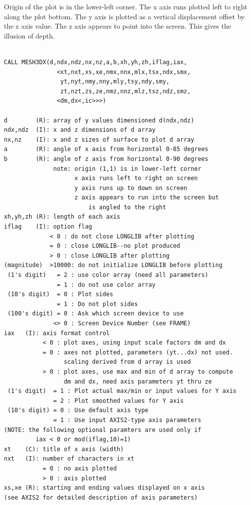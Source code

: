 \documentclass[11pt]{report}
\begin{document}
Origin of the plot is in the lower-left corner.  The x axis runs
plotted left to right along the plot bottom.  The y axis is plotted
as a vertical displacement offset by the z axis value.  The z axis
appears to point into the screen.  This gives the illusion of depth.
\begin{verbatim}

CALL MESH3DX(d,ndx,ndz,nx,nz,a,b,xh,yh,zh,iflag,iax,
               <xt,nxt,xs,xe,nmx,nnx,mlx,tsx,ndx,smx,
                yt,nyt,nmy,nny,mly,tsy,ndy,smy,
                zt,nzt,zs,ze,nmz,nnz,mlz,tsz,ndz,smz,
               <dm,dx<,ic>>>)

d        (R): array of y values dimensioned d(ndx,ndz)
ndx,ndz  (I): x and z dimensions of d array
nx,nz    (I): x and z sizes of surface to plot d array
a        (R): angle of x axis from horizontal 0-85 degrees
b        (R): angle of z axis from horizontal 0-90 degrees
              note: origin (1,1) is in lower-left corner
                    x axis runs left to right on screen
                    y axis runs up to down on screen
                    z axis appears to run into the screen but
                        is angled to the right
xh,yh,zh (R): length of each axis
iflag    (I): option flag
             < 0 : do not close LONGLIB after plotting
             = 0 : close LONGLIB--no plot produced
             > 0 : close LONGLIB after plotting
(magnitude)  >10000: do not initialize LONGLIB before plotting
 (1's digit)   = 2 : use color array (need all parameters)
               = 1 : do not use color array 
 (10's digit)  = 0 : Plot sides
               = 1 : Do not plot sides
 (100's digit) = 0 : Ask which screen device to use
              <> 0 : Screen Device Number (see FRAME)
iax   (I): axis format control
           < 0 : plot axes, using input scale factors dm and dx
           = 0 : axes not plotted, parameters (yt...dx) not used.
                 scaling derived from d array is used
           > 0 : plot axes, use max and min of d array to compute
                 dm and dx, need axis parameters yt thru ze
 (1's digit)  = 1 : Plot actual max/min or input values for Y axis
              = 2 : Plot smoothed values for Y axis
 (10's digit) = 0 : Use default axis type
              = 1 : Use input AXIS2-type axis parameters
(NOTE: the following optional paramters are used only if
         iax < 0 or mod(iflag,10)=1)
xt    (C): title of x axis (width)
nxt   (I): number of characters in xt
           = 0 : no axis plotted
           > 0 : axis plotted
xs,xe (R): starting and ending values displayed on x axis
(see AXIS2 for detailed description of axis parameters)

\end{verbatim}
\end{document}
